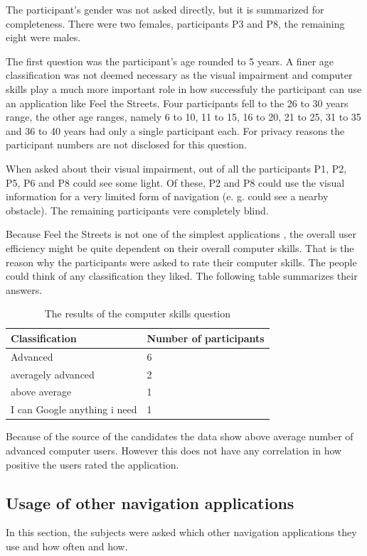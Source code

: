 \documentclass[nolof,digital]{fithesis3}
\begin{document}
The participant's gender was not asked directly, but it is summarized for completeness. There were two females, participants P3 and P8, the remaining eight were males.

The first question was the participant's age rounded to 5 years. A finer age classification was not deemed necessary as the visual impairment and computer skills play a much more important role in how successfuly the participant can use an application like Feel the Streets. Four participants fell to the 26 to 30 years range, the other age ranges, namely 6 to 10, 11 to 15, 16 to 20, 21 to 25, 31 to 35 and 36 to 40 years had only a single participant each. For privacy reasons the participant numbers are not disclosed for this question.

When asked about their visual impairment, out of all the participants P1, P2, P5, P6 and P8 could see some light. Of these, P2 and P8 could use the visual information for a very limited form of navigation (e. g. could see a nearby obstacle). The remaining participants vere completely blind.

Because Feel the Streets is not one of the simplest applications , the overall user efficiency might be quite dependent on their overall computer skills. That is the reason why the participants were asked to rate their computer skills. The people could think of any classification they liked. The following table summarizes their answers.
\begin{table}
\caption{The results of the computer skills question}
\begin{tabularx}{\textwidth}{ |X|X| }
Classification & Number of participants \\
\hline
Advanced & 6 \\
averagely advanced & 2 \\
above average & 1 \\
I can Google anything i need & 1 \\
\end{tabularx}
\end{table}
Because of the source of the candidates the data show above average number of advanced computer users. However this does not have any correlation in how positive the users rated the application.
\subsection{Usage of other navigation applications}
In this section, the subjects were asked which other navigation applications they use and how often and how.
\end{document}

